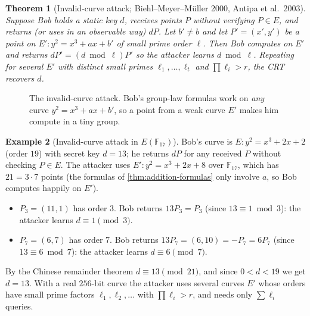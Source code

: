 \documentclass[11pt,a4paper,oneside]{book}
\theoremstyle{plain}
\newtheorem{theorem}{Theorem}[chapter]
\theoremstyle{definition}
\newtheorem{example}[theorem]{Example}
\theoremstyle{remark}
\newcommand{\F}{\mathbb{F}}
\begin{document}
\begin{theorem}[Invalid-curve attack; Biehl--Meyer--M\"uller 2000, Antipa et al.\ 2003]\label{thm:invalid-curve}
Suppose Bob holds a static key $d$, receives points $P$ without verifying $P\in E$, and returns (or uses in an observable way) $dP$. Let $b'\ne b$ and let $P'=(x',y')$ be a point on $E':y^2=x^3+ax+b'$ of small prime order $\ell$. Then Bob computes on $E'$ and returns $dP'=(d\bmod\ell)P'$ so the attacker learns $d\bmod\ell$. Repeating for several $E'$ with distinct small primes $\ell_1,\dots,\ell_t$ and $\prod\ell_i>r$, the CRT recovers $d$.
\end{theorem}

\begin{figure}[ht]
\centering
{}
\caption{The invalid-curve attack. Bob's group-law formulas work on \emph{any} curve $y^2=x^3+ax+b'$, so a point from a weak curve $E'$ makes him compute in a tiny group.}
\label{fig:invalid}
\end{figure}

\begin{example}[Invalid-curve attack in $E(\F_{17})$]
Bob's curve is $E:y^2=x^3+2x+2$ (order $19$) with secret key $d=13$; he returns $dP$ for any received $P$ without checking $P\in E$. The attacker uses $E':y^2=x^3+2x+8$ over $\F_{17}$, which has $21=3\cdot7$ points (the formulas of \cref{thm:addition-formulas} only involve $a$, so Bob computes happily on $E'$).
\begin{itemize}[nosep]
\item $P_3=(11,1)$ has order $3$. Bob returns $13P_3=P_3$ (since $13\equiv1\bmod3$): the attacker learns $d\equiv1\pmod3$.
\item $P_7=(6,7)$ has order $7$. Bob returns $13P_7=(6,10)=-P_7=6P_7$ (since $13\equiv6\bmod7$): the attacker learns $d\equiv6\pmod7$.
\end{itemize}
By the Chinese remainder theorem $d\equiv13\pmod{21}$, and since $0<d<19$ we get $d=13$. With a real $256$-bit curve the attacker uses several curves $E'$ whose orders have small prime factors $\ell_1,\ell_2,\dots$ with $\prod\ell_i>r$, and needs only $\sum\ell_i$ queries.
\end{example}
\end{document}
